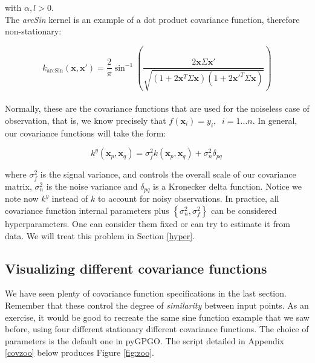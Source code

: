 \documentclass[10pt,a4paper,twoside]{book}
\begin{document}
with $\alpha, l > 0$. \\


The \textit{arcSin} kernel is an example of a dot product covariance function, therefore non-stationary:

\begin{equation}
k_{\textrm{arcSin}}(\boldsymbol{x}, \boldsymbol{x'}) = \dfrac{2}{\pi}\sin^{-1}\left(\dfrac{2\boldsymbol{x}\Sigma\boldsymbol{x'}}{\sqrt{(1 + 2\boldsymbol{x}^T\Sigma\boldsymbol{x})(1 + 2\boldsymbol{x'}^T\Sigma\boldsymbol{x})}}   \right)
\end{equation}\\

Normally, these are the covariance functions that are used for the noiseless case of observation, that is, we know precisely that $f(\boldsymbol{x}_i) = y_i, \;\; i=1\dots n$. In general, our covariance functions will take the form:

\begin{equation}
k^y(\boldsymbol{x}_p, \boldsymbol{x}_q) = \sigma^2_f k(\boldsymbol{x}_p, \boldsymbol{x}_q) + \sigma^2_n \delta_{pq} \,
\end{equation}

where $\sigma^2_f$ is the signal variance, and controls the overall scale of our covariance matrix, $\sigma^2_n$ is the noise variance and $\delta_{pq}$ is a Kronecker delta function. Notice we note now $k^y$ instead of $k$ to account for noisy observations. In practice, all covariance function internal parameters plus $\left\lbrace\sigma_n^2, \sigma^2_f\right\rbrace$ can be considered hyperparameters. One can consider them fixed or can try to estimate it from data. We will treat this problem in Section \ref{hyper}.


\subsection{Visualizing different covariance functions}

We have seen plenty of covariance function specifications in the last section. Remember that these control the degree of \textit{similarity} between input points. As an exercise, it would be good to recreate the same sine function example that we saw before, using four different stationary different covariance functions. The choice of parameters is the default one in pyGPGO. The script detailed in Appendix \ref{covzoo} below produces Figure \ref{fig:zoo}. \\
\end{document}
